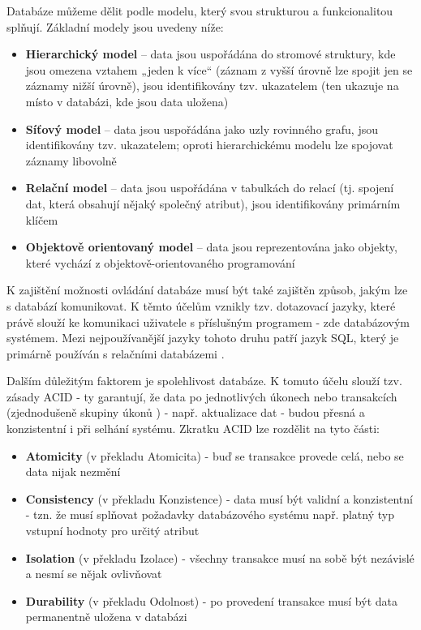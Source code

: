 	Databáze můžeme dělit podle modelu, který svou strukturou a funkcionalitou splňují. Základní modely jsou uvedeny níže: \cite{DBModel}
		
	\begin{itemize}
		\item \textbf{Hierarchický model} – data jsou uspořádána do stromové struktury, kde jsou omezena vztahem „jeden k více“ (záznam z vyšší úrovně lze spojit jen se záznamy nižší úrovně), jsou identifikovány tzv. ukazatelem (ten ukazuje na místo v databázi, kde jsou data uložena) \cite{HierarchDB}
		\item \textbf{Síťový model} – data jsou uspořádána jako uzly rovinného grafu, jsou identifikovány tzv. ukazatelem; oproti hierarchickému modelu lze spojovat záznamy libovolně \cite{SitDB} 
		\item \textbf{Relační model} – data jsou uspořádána v tabulkách do relací (tj. spojení dat, která obsahují nějaký společný atribut), jsou identifikovány primárním klíčem \cite{RelacDB}
		\item \textbf{Objektově orientovaný model} – data jsou reprezentována jako objekty, které vychází z objektově-orientovaného programování \cite{OOPDB}
	\end{itemize}
	
	K zajištění možnosti ovládání databáze musí být také zajištěn způsob, jakým lze s databází komunikovat. K těmto účelům vznikly tzv. dotazovací jazyky, které právě slouží ke komunikaci uživatele s příslušným programem \cite{DotazJazyk} - zde databázovým systémem. Mezi nejpoužívanější jazyky tohoto druhu patří jazyk SQL, který je primárně používán s relačními databázemi \cite{SQL}.
	
	Dalším důležitým faktorem je spolehlivost databáze. K tomuto účelu slouží tzv. zásady ACID - ty garantují, že data po jednotlivých úkonech nebo transakcích (zjednodušeně skupiny úkonů \cite{Transakce}) - např. aktualizace dat - budou přesná a konzistentní i při selhání systému. Zkratku ACID lze rozdělit na tyto části:
	
	\begin{itemize}
		\item \textbf{Atomicity} (v překladu Atomicita) - buď se transakce provede celá, nebo se data nijak nezmění
		\item \textbf{Consistency} (v překladu Konzistence) - data musí být validní a konzistentní - tzn. že musí splňovat požadavky databázového systému např. platný typ vstupní hodnoty pro určitý atribut
		\item \textbf{Isolation} (v překladu Izolace) - všechny transakce musí na sobě být nezávislé a nesmí se nějak ovlivňovat
		\item \textbf{Durability} (v překladu Odolnost) - po provedení transakce musí být data permanentně uložena v databázi
		\cite{ACID}
	\end{itemize}
	
